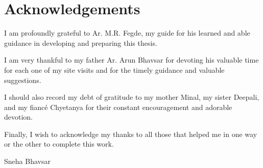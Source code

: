 \section*{Acknowledgements} %
\label{sec:ack}

I am profoundly grateful to Ar. M.R. Fegde, my guide for his learned and able guidance in developing and preparing this thesis.

I am very thankful to my father Ar. Arun Bhavsar for devoting his valuable time for each one of my site visits and for the timely guidance and valuable suggestions.

I should also record my debt of gratitude to my mother Minal, my sister Deepali, and my fianc\'{e} Chyetanya for their constant encouragement and adorable devotion.

Finally, I wish to acknowledge my thanks to all those that helped me in one way or the other to complete this work.

\vspace{3mm}

Sneha Bhavsar

\vfill

